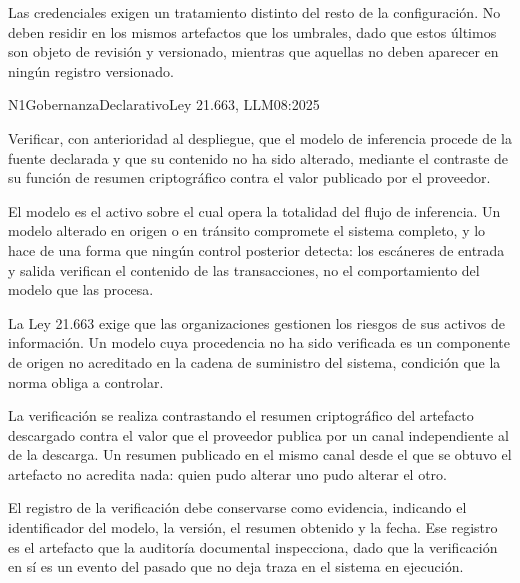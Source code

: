 Las credenciales exigen un tratamiento distinto del resto de la configuración. No deben residir en los mismos artefactos que los umbrales, dado que estos últimos son objeto de revisión y versionado, mientras que aquellas no deben aparecer en ningún registro versionado.


  {N1}{Gobernanza}{Declarativo}{Ley 21.663, LLM08:2025}

Verificar, con anterioridad al despliegue, que el modelo de inferencia procede de la fuente declarada y que su contenido no ha sido alterado, mediante el contraste de su función de resumen criptográfico contra el valor publicado por el proveedor.

El modelo es el activo sobre el cual opera la totalidad del flujo de inferencia. Un modelo alterado en origen o en tránsito compromete el sistema completo, y lo hace de una forma que ningún control posterior detecta: los escáneres de entrada y salida verifican el contenido de las transacciones, no el comportamiento del modelo que las procesa.

La Ley 21.663 exige que las organizaciones gestionen los riesgos de sus activos de información. Un modelo cuya procedencia no ha sido verificada es un componente de origen no acreditado en la cadena de suministro del sistema, condición que la norma obliga a controlar.

La verificación se realiza contrastando el resumen criptográfico del artefacto descargado contra el valor que el proveedor publica por un canal independiente al de la descarga. Un resumen publicado en el mismo canal desde el que se obtuvo el artefacto no acredita nada: quien pudo alterar uno pudo alterar el otro.

El registro de la verificación debe conservarse como evidencia, indicando el identificador del modelo, la versión, el resumen obtenido y la fecha. Ese registro es el artefacto que la auditoría documental inspecciona, dado que la verificación en sí es un evento del pasado que no deja traza en el sistema en ejecución.

